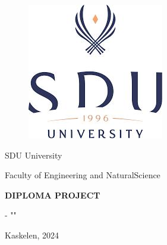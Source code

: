 \begin{titlepage}
\begin{center}
\begin{figure}[h]
    \centering
    \includegraphics[scale=0.5]{figures/logo1.png}
\end{figure}
\large
SDU University

Faculty of Engineering and NaturalScience
\vspace{1cm}


\vspace{3cm}
\Large\textbf{DIPLOMA PROJECT}

\vspace{0.5cm}
\small\mytitle

\large
\textbf{\myauthor}

\vspace{1cm}
\mydegreecode - "\mydegree"

\vfill
Kaskelen, 2024

\end{center}
\end{titlepage}